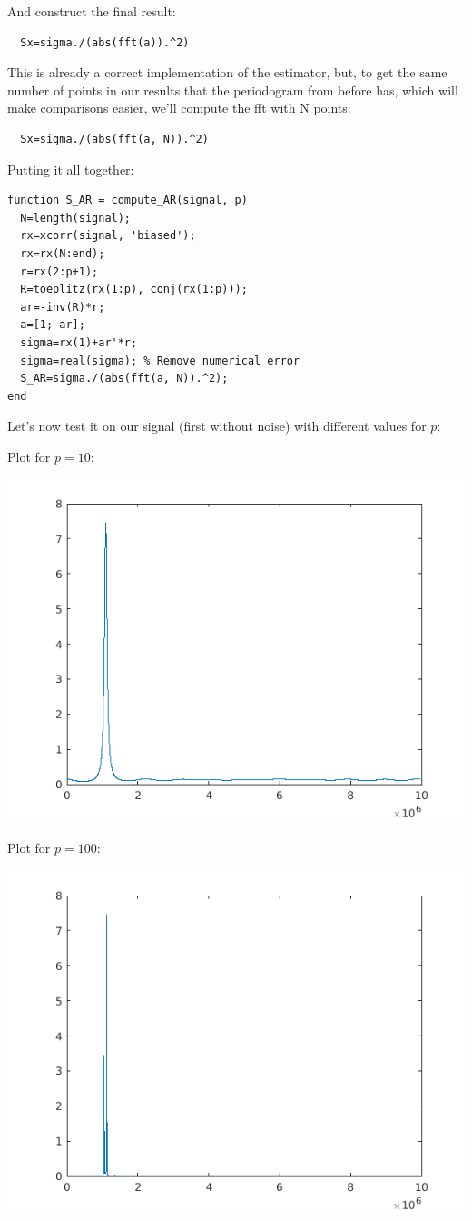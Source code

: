 \documentclass[conference,9pt]{IEEEtran}
\begin{document}
And construct the final result:
\begin{verbatim}
  Sx=sigma./(abs(fft(a)).^2)
\end{verbatim}

This is already a correct implementation of the estimator, but, to get the same number of points in our results that the periodogram from before has, which will make comparisons easier, we'll compute the fft with N points:
\begin{verbatim}
  Sx=sigma./(abs(fft(a, N)).^2)
\end{verbatim}

Putting it all together:
\begin{verbatim}
function S_AR = compute_AR(signal, p)
  N=length(signal);
  rx=xcorr(signal, 'biased');
  rx=rx(N:end);
  r=rx(2:p+1);
  R=toeplitz(rx(1:p), conj(rx(1:p)));
  ar=-inv(R)*r;
  a=[1; ar];
  sigma=rx(1)+ar'*r;
  sigma=real(sigma); % Remove numerical error
  S_AR=sigma./(abs(fft(a, N)).^2);
end
\end{verbatim}

Let's now test it on our signal (first without noise) with different values for $p$:

Plot for $p=10$:

\includegraphics[scale=0.6]{p10}

Plot for $p=100$:

\includegraphics[scale=0.6]{p100}
\end{document}
